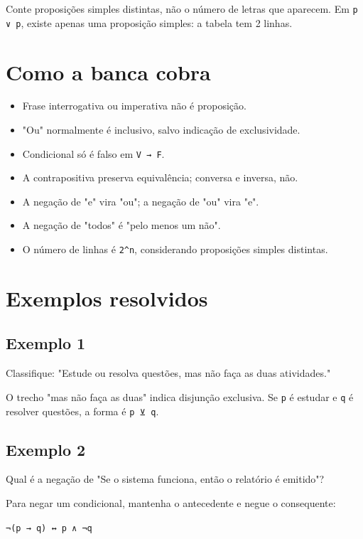 \documentclass[11pt,a4paper]{article}
\begin{document}
Conte proposições simples distintas, não o número de letras que aparecem. Em \texttt{p ∨ p}, existe apenas uma proposição simples: a tabela tem 2 linhas.

\section*{Como a banca cobra}

\begin{itemize}
  \item Frase interrogativa ou imperativa não é proposição.
  \item "Ou" normalmente é inclusivo, salvo indicação de exclusividade.
  \item Condicional só é falso em \texttt{V → F}.
  \item A contrapositiva preserva equivalência; conversa e inversa, não.
  \item A negação de "e" vira "ou"; a negação de "ou" vira "e".
  \item A negação de "todos" é "pelo menos um não".
  \item O número de linhas é \texttt{2\textasciicircum{}n}, considerando proposições simples distintas.
\end{itemize}

\section*{Exemplos resolvidos}

\subsection*{Exemplo 1}

Classifique: "Estude ou resolva questões, mas não faça as duas atividades."

O trecho "mas não faça as duas" indica disjunção exclusiva. Se \texttt{p} é estudar e \texttt{q} é resolver questões, a forma é \texttt{p ⊻ q}.

\subsection*{Exemplo 2}

Qual é a negação de "Se o sistema funciona, então o relatório é emitido"?

Para negar um condicional, mantenha o antecedente e negue o consequente:

\texttt{¬(p → q) ↔ p ∧ ¬q}
\end{document}
